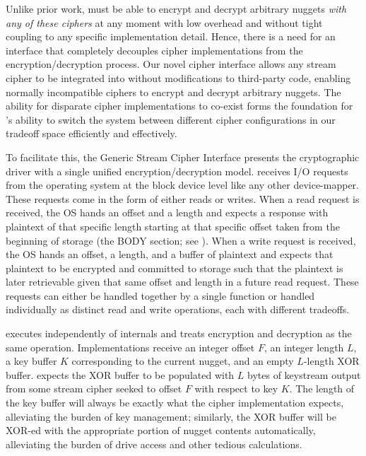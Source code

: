 
Unlike prior work, \sys must be able to encrypt and decrypt arbitrary nuggets
\emph{with any of these ciphers} at any moment with low overhead and without
tight coupling to any specific implementation detail. Hence, there is a need for
an interface that completely decouples cipher implementations from the
encryption/decryption process. Our novel cipher interface allows any stream
cipher to be integrated into \sys without modifications to third-party code,
enabling normally incompatible ciphers to encrypt and decrypt arbitrary nuggets.
The ability for disparate cipher implementations to co-exist forms the
foundation for \sys's ability to switch the system between different cipher
configurations in our tradeoff space efficiently and effectively.

To facilitate this, the Generic Stream Cipher Interface presents the
cryptographic driver with a single unified encryption/decryption model. \sys
receives I/O requests from the operating system at the block device level like
any other device-mapper. These requests come in the form of either reads or
writes. When a read request is received, the OS hands \sys an offset and a
length and expects a response with plaintext of that specific length starting at
that specific offset taken from the beginning of storage (\ie the BODY section;
see ). When a write request is received, the OS hands \sys an
offset, a length, and a buffer of plaintext and expects that plaintext to be
encrypted and committed to storage such that the plaintext is later retrievable
given that same offset and length in a future read request. These requests can
either be handled together by a single function or handled individually as
distinct read and write operations, each with different tradeoffs.


 executes independently of \sys internals and
treats encryption and decryption as the same operation. Implementations receive
an integer offset $F$, an integer length $L$, a key buffer $K$ corresponding to
the current nugget, and an empty $L$-length XOR buffer. \sys expects the XOR
buffer to be populated with $L$ bytes of keystream output from some stream
cipher seeked to offset $F$ with respect to key $K$. The length of the key
buffer will always be exactly what the cipher implementation expects,
alleviating the burden of key management; similarly, the XOR buffer will be
XOR-ed with the appropriate portion of nugget contents automatically,
alleviating the burden of drive access and other tedious calculations.

